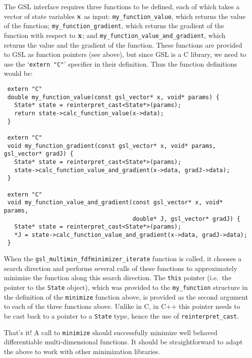 \documentclass[a4,oneside]{book}
\def\codesize{\small}
\def\x{\ensuremath{{\bf x}}}
\def\code#1{{\codesize\texttt{#1}}}
\begin{document}
%
The GSL interface requires three functions to be defined, each of
which takes a vector of state variables $\x$ as input:
\code{my\_function\_value}, which returns the value of the function;
\code{my\_function\_gradient}, which returns the gradient of the
function with respect to $\x$; and
\code{my\_function\_value\_and\_gradient}, which returns the value and
the gradient of the function. These functions are provided to GSL as
function pointers (see above), but since GSL is a C library, we need
to use the `\code{extern "C"}' specifier in their definition. Thus the
function definitions would be:
%
\begin{lstlisting}
 extern "C" 
 double my_function_value(const gsl_vector* x, void* params) {
   State* state = reinterpret_cast<State*>(params);
   return state->calc_function_value(x->data);
 }

 extern "C"
 void my_function_gradient(const gsl_vector* x, void* params, gsl_vector* gradJ) { 
   State* state = reinterpret_cast<State*>(params);
   state->calc_function_value_and_gradient(x->data, gradJ->data);
 }

 extern "C"
 void my_function_value_and_gradient(const gsl_vector* x, void* params,
                                     double* J, gsl_vector* gradJ) { 
   State* state = reinterpret_cast<State*>(params);
   *J = state->calc_function_value_and_gradient(x->data, gradJ->data);
 }
\end{lstlisting}
%
When the \code{gsl\_multimin\_fdfminimizer\_iterate} function is
called, it chooses a search direction and performs several calls of
these functions to approximately minimize the function along this
search direction. The \code{this} pointer (i.e.\ the pointer to the
\code{State} object), which was provided to the \code{my\_function}
structure in the definition of the \code{minimize} function above, is
provided as the second argument to each of the three functions
above. Unlike in C, in C++ this pointer needs to be cast back to a
pointer to a \code{State} type, hence the use of
\code{reinterpret\_cast}.

That's it! A call to \code{minimize} should successfully minimize well
behaved differentiable multi-dimensional functions.  It should be
straightforward to adapt the above to work with other minimization
libraries.
\end{document}
